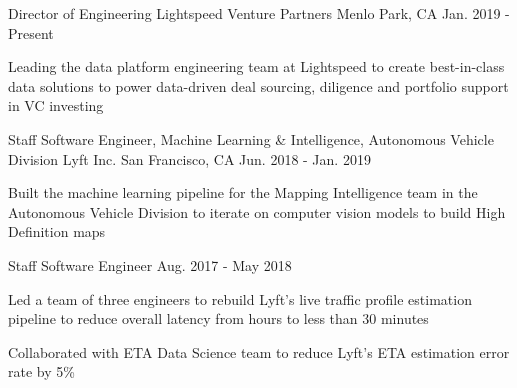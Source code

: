 

\begin{cventries}

  \cventry
    {Director of Engineering} %
    {Lightspeed Venture Partners} %
    {Menlo Park, CA} %
    {Jan. 2019 - Present} %
    {
      \begin{cvitems} %
        \item{Leading the data platform engineering team at Lightspeed to create best-in-class data solutions to power data-driven deal sourcing, diligence and portfolio support in VC investing}
      \end{cvitems}
    }

  \cventry
    {Staff Software Engineer, Machine Learning \& Intelligence, Autonomous Vehicle Division} %
    {Lyft Inc.} %
    {San Francisco, CA} %
    {Jun. 2018 - Jan. 2019} %
    {
      \begin{cvitems} %
        \item{Built the machine learning pipeline for the Mapping Intelligence team in the Autonomous Vehicle Division to iterate on computer vision models to build High Definition maps}
      \end{cvitems}
    }

  \cventry
    {Staff Software Engineer} %
    {} %
    {} %
    {Aug. 2017 - May 2018} %
    {
      \begin{cvitems} %
        \item{Led a team of three engineers to rebuild Lyft's live traffic profile estimation pipeline to reduce overall latency from hours to less than 30 minutes}
        \item{Collaborated with ETA Data Science team to reduce Lyft's ETA estimation error rate by 5\%}
      \end{cvitems}
    }


\end{cventries}
